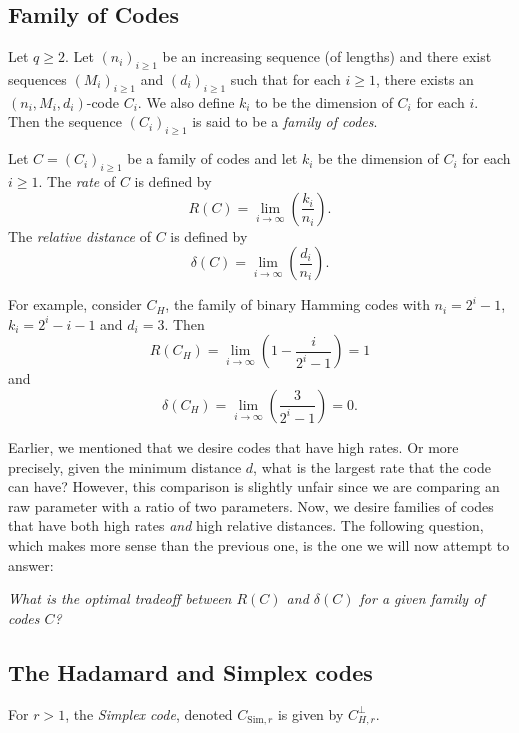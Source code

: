 \subsection{Family of Codes}

\begin{definition}
    Let $q\geq 2$. Let $(n_i)_{i\geq 1}$ be an increasing sequence (of lengths) and there exist sequences $(M_i)_{i\geq1}$ and $(d_i)_{i\geq 1}$ such that for each $i\geq 1$, there exists an $(n_i,M_i,d_i)$-code $C_i$. We also define $k_i$ to be the dimension of $C_i$ for each $i$. Then the sequence $(C_i)_{i\geq1}$ is said to be a \textit{family of codes}.
\end{definition}

\begin{definition}
    Let $C=(C_i)_{i\geq 1}$ be a family of codes and let $k_i$ be the dimension of $C_i$ for each $i\geq 1$. The \textit{rate} of $C$ is defined by
    $$R(C)=\lim_{i\to\infty}\left(\frac{k_i}{n_i}\right).$$
    The \textit{relative distance} of $C$ is defined by
    $$\delta(C)=\lim_{i\to\infty}\left(\frac{d_i}{n_i}\right).$$
\end{definition}

For example, consider $C_H$, the family of binary Hamming codes with $n_i=2^i-1$, $k_i=2^i-i-1$ and $d_i=3$. Then
$$R(C_H)=\lim_{i\to\infty}\left(1-\frac{i}{2^i-1}\right)=1$$
and
$$\delta(C_H)=\lim_{i\to\infty}\left(\frac{3}{2^i-1}\right)=0.$$

\vspace{2mm}
Earlier, we mentioned that we desire codes that have high rates. Or more precisely, given the minimum distance $d$, what is the largest rate that the code can have? However, this comparison is slightly unfair since we are comparing an raw parameter with a ratio of two parameters. Now, we desire families of codes that have both high rates \textit{and} high relative distances. The following question, which makes more sense than the previous one, is the one we will now attempt to answer:

\textit{What is the optimal tradeoff between $R(C)$ and $\delta(C)$ for a given family of codes $C$?}

\subsection{The Hadamard and Simplex codes}

\begin{definition}
    For $r>1$, the \textit{Simplex code}, denoted $C_{\text{Sim},r}$ is given by $C_{H,r}^\perp$.
\end{definition}

